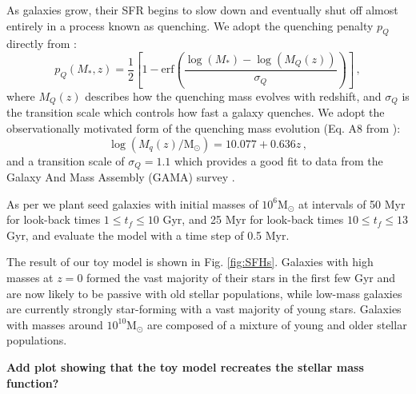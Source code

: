 \documentclass[fleqn,usenatbib]{mnras}
\begin{document}
As galaxies grow, their SFR begins to slow down and eventually shut off almost entirely in a process known as quenching. We adopt the quenching penalty $p_Q$ directly from \citet{Childress2014}:
\begin{equation}
    p_Q(M_*,z) = \frac{1}{2}\left[1 - \mathrm{erf}\left(\frac{\log(M_*) - \log(M_Q(z))}{\sigma_Q}\right)\right]\,,
    \label{eq:pq}
\end{equation}
where $M_Q(z)$ describes how the quenching mass evolves with redshift, and $\sigma_Q$ is the transition scale which controls how fast a galaxy quenches. We adopt the observationally motivated form of the quenching mass evolution (Eq. A8 from \citealt{Childress2014}):
\begin{equation}
    \log(M_q(z)/\mathrm{M}_{\odot}) = 10.077 + 0.636z \,, 
    \label{eq:mq}
\end{equation}
and a transition scale of $\sigma_Q = 1.1$ which provides a good fit to data from the Galaxy And Mass Assembly (GAMA) survey \citep{Baldry2012}.

As per \citet{Childress2014} we plant seed galaxies with initial masses of $10^6 \mathrm{M}_{\odot}$ at intervals of 50 Myr for look-back times $1 \leq t_f \leq 10$ Gyr, and 25 Myr for look-back times $10 \leq t_f \leq 13$ Gyr, and evaluate the model with a time step of 0.5 Myr.

The result of our toy model is shown in Fig. \ref{fig:SFHs}. Galaxies with high masses at $z=0$ formed the vast majority of their stars in the first few Gyr and are now likely to be passive with old stellar populations, while low-mass galaxies are currently strongly star-forming with a vast majority of young stars. Galaxies with masses around $10^{10} \mathrm{M}_{\odot}$ are composed of a mixture of young and older stellar populations.

\textbf{Add plot showing that the toy model recreates the stellar mass function?}
\end{document}
